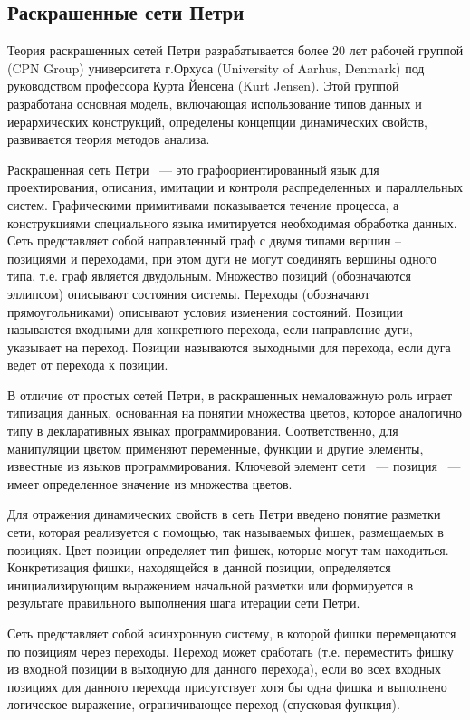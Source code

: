 \subsection{Раскрашенные сети Петри}

Теория раскрашенных сетей Петри разрабатывается более 20 лет рабочей группой (CPN Group) университета г.Орхуса (University of Aarhus, Denmark) под руководством профессора Курта Йенсена (Kurt Jensen). Этой группой разработана основная модель, включающая использование типов данных и иерархических конструкций, определены концепции динамических свойств, развивается теория методов анализа.

Раскрашенная сеть Петри ~--- это графоориентированный язык для проектирования, описания, имитации и контроля распределенных и параллельных систем. Графическими примитивами показывается течение процесса, а конструкциями специального языка имитируется необходимая обработка данных. Сеть представляет собой направленный граф с двумя типами вершин – позициями и переходами, при этом дуги не могут соединять вершины одного типа, т.е. граф является двудольным. Множество позиций (обозначаются эллипсом) описывают состояния системы. Переходы (обозначают прямоугольниками) описывают условия изменения состояний. Позиции называются входными для конкретного перехода, если направление дуги, указывает на переход. Позиции называются выходными для перехода, если дуга ведет от перехода к позиции.

В отличие от простых сетей Петри, в раскрашенных немаловажную роль играет типизация данных, основанная на понятии множества цветов, которое аналогично типу в декларативных языках программирования. Соответственно, для манипуляции цветом применяют переменные, функции и другие элементы, известные из языков программирования. Ключевой элемент сети ~--- позиция ~--- имеет определенное значение из множества цветов. \cite{Shahov}

Для отражения динамических свойств в сеть Петри введено понятие разметки сети, которая реализуется с помощью, так называемых фишек, размещаемых в позициях. Цвет позиции определяет тип фишек, которые могут там находиться. Конкретизация фишки, находящейся в данной позиции, определяется инициализирующим выражением начальной разметки или формируется в результате правильного выполнения шага итерации сети Петри.

Сеть представляет собой асинхронную систему, в которой фишки перемещаются по позициям через переходы. Переход может сработать (т.е. переместить фишку из входной позиции в выходную для данного перехода), если во всех входных позициях для данного перехода присутствует хотя бы одна фишка и выполнено логическое выражение, ограничивающее переход (спусковая функция).


